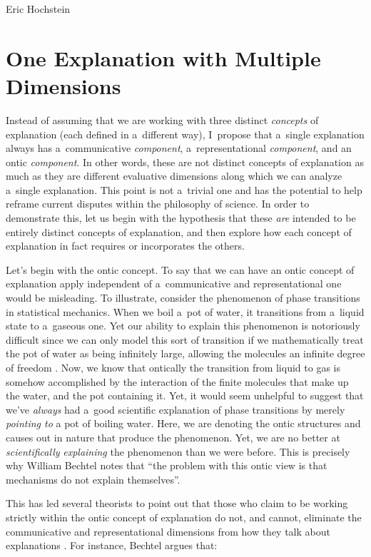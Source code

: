 \begin{artengenv}{Eric Hochstein}
\section{One Explanation with Multiple Dimensions}
Instead of assuming that we are working with three distinct \textit{concepts} of explanation (each defined in a~different way), I~propose that a~single explanation always has a~communicative \textit{component}, a~representational \textit{component}, and an ontic \textit{component}. In other words, these are not distinct concepts of explanation as much as they are different evaluative dimensions along which we can analyze a~single explanation. This point is not a~trivial one and has the potential to help reframe current disputes within the philosophy of science. In order to demonstrate this, let us begin with the hypothesis that these \textit{are} intended to be entirely distinct concepts of explanation, and then explore how each concept of explanation in fact requires or incorporates the others.

Let's begin with the ontic concept. To say that we can have an ontic concept of explanation apply independent of a~communicative and representational one would be misleading. To illustrate, consider the phenomenon of phase transitions in statistical mechanics. When we boil a~pot of water, it transitions from a~liquid state to a~gaseous one. Yet our ability to explain this phenomenon is notoriously difficult since we can only model this sort of transition if we mathematically treat the pot of water as being infinitely large, allowing the molecules an infinite degree of freedom
\parencite[][]{batterman_devil_2002}. %
 Now, we know that ontically the transition from liquid to gas is somehow accomplished by the interaction of the finite molecules that make up the water, and the pot containing it. Yet, it would seem unhelpful to suggest that we've \textit{always} had a~good scientific explanation of phase transitions by merely \textit{pointing to} a pot of boiling water. Here, we are denoting the ontic structures and causes out in nature that produce the phenomenon. Yet, we are no better at \textit{scientifically} \textit{explaining} the phenomenon than we were before. This is precisely why William Bechtel 
\parencite*[][p.18]{bechtel_mental_2008} %
 notes that ``the problem with this ontic view is that mechanisms do not explain themselves''.

This has led several theorists to point out that those who claim to be working strictly within the ontic concept of explanation do not, and cannot, eliminate the communicative and representational dimensions from how they talk about explanations
\parencites[][p.18]{bechtel_mental_2008}[][]{wright_ontic_2015}[][]{bokulich_representing_2018}. %
 For instance, Bechtel argues that:


\end{artengenv}
